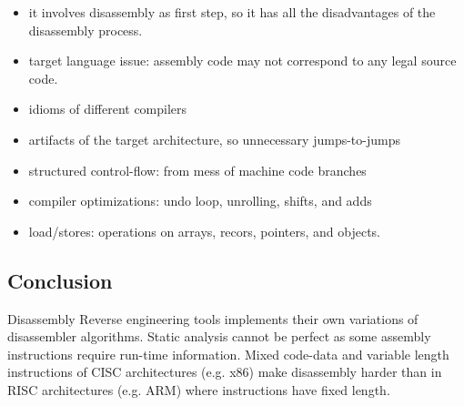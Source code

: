 \begin{itemize}
    \item it involves disassembly as first step, so it has all the disadvantages of the disassembly process. 
    \item target language issue: assembly code may not correspond to any legal source code. 
    \item idioms of different compilers
    \item artifacts of the target architecture, so unnecessary jumps-to-jumps
    \item structured control-flow: from mess of machine code branches
    \item compiler optimizations: undo loop, unrolling, shifts, and adds 
    \item load/stores: operations on arrays, recors, pointers, and objects. 
\end{itemize}


\subsection{Conclusion}

Disassembly Reverse engineering tools implements their own variations of disassembler algorithms. 
Static analysis cannot be perfect as some assembly instructions require run-time information.
Mixed code-data and variable length instructions of CISC architectures (e.g. x86) make disassembly harder than in RISC architectures (e.g. ARM) where instructions have fixed length. 